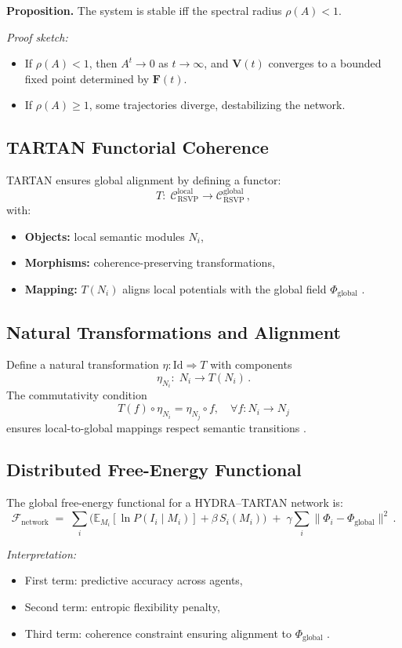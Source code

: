 \documentclass[12pt]{article}
\begin{document}
\textbf{Proposition.} The system is stable iff the spectral radius \(\rho(A) < 1\).

\textit{Proof sketch:}
\begin{itemize}
  \item If \(\rho(A)<1\), then \(A^t \to 0\) as \(t\to\infty\), and \(\mathbf{V}(t)\) converges to a bounded fixed point determined by \(\mathbf{F}(t)\).
  \item If \(\rho(A)\ge 1\), some trajectories diverge, destabilizing the network.
\end{itemize}

\subsection*{TARTAN Functorial Coherence}
TARTAN ensures global alignment by defining a functor:
\[
T:\; \mathcal{C}_{\text{RSVP}}^{\text{local}} \longrightarrow \mathcal{C}_{\text{RSVP}}^{\text{global}} \, ,
\]
with:
\begin{itemize}
  \item \textbf{Objects:} local semantic modules \(N_i\),
  \item \textbf{Morphisms:} coherence-preserving transformations,
  \item \textbf{Mapping:} \(T(N_i)\) aligns local potentials with the global field \(\Phi_{\text{global}}\) \citep{maclane1998}.
\end{itemize}

\subsection*{Natural Transformations and Alignment}
Define a natural transformation \(\eta: \mathrm{Id} \Rightarrow T\) with components
\[
\eta_{N_i}:\; N_i \to T(N_i) \, .
\]
The commutativity condition
\[
T(f)\circ \eta_{N_i} = \eta_{N_j}\circ f, \quad \forall f:N_i \to N_j
\]
ensures local-to-global mappings respect semantic transitions \citep{lawvere2009, may1999}.

\subsection*{Distributed Free-Energy Functional}
The global free-energy functional for a HYDRA–TARTAN network is:
\[
\mathcal{F}_{\text{network}} \;=\; \sum_i \Big( \mathbb{E}_{M_i}[\ln P(I_i \mid M_i)] + \beta\, S_i(M_i) \Big)
\;+\; \gamma \sum_i \|\Phi_i - \Phi_{\text{global}}\|^2 \, .
\]

\emph{Interpretation:}
\begin{itemize}
  \item First term: predictive accuracy across agents,
  \item Second term: entropic flexibility penalty,
  \item Third term: coherence constraint ensuring alignment to \(\Phi_{\text{global}}\) \citep{friston2010}.
\end{itemize}
\end{document}

